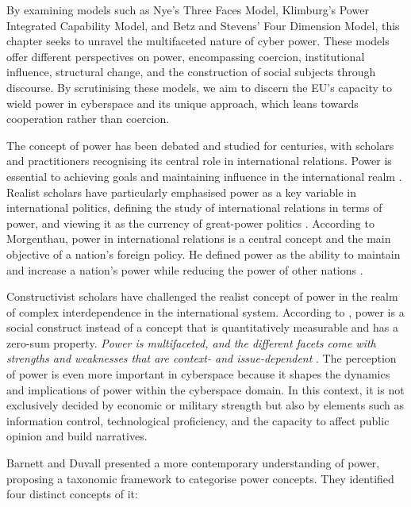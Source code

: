 By examining models such as Nye's Three Faces Model, Klimburg's Power Integrated Capability Model, and Betz and Stevens' Four Dimension Model, this chapter seeks to unravel the multifaceted nature of cyber power. These models offer different perspectives on power, encompassing coercion, institutional influence, structural change, and the construction of social subjects through discourse. By scrutinising these models, we aim to discern the EU's capacity to wield power in cyberspace and its unique approach, which leans towards cooperation rather than coercion.

The concept of power has been debated and studied for centuries, with scholars and practitioners recognising its central role in international relations. Power is essential to achieving goals and maintaining influence in the international realm \autocite{holsti_1964_the}. Realist scholars have particularly emphasised power as a key variable in international politics, defining the study of international relations in terms of power, and viewing it as the currency of great-power politics \autocite{fels_2016_power}. According to Morgenthau, power in international relations is a central concept and the main objective of a nation's foreign policy. He defined power as the ability to maintain and increase a nation's power while reducing the power of other nations \autocite{morgenthau_1948_politics}. 

Constructivist scholars have challenged the realist concept of power in the realm of complex interdependence in the international system. According to \textcite{pan_2014_rethinking}, power is a social construct instead of a concept that is quantitatively measurable and has a zero-sum property. \textit{Power is multifaceted, and the different facets come with strengths and weaknesses that are context- and issue-dependent} \autocite[14]{dunncavelty_2018_europes}. The perception of power is even more important in cyberspace because it shapes the dynamics and implications of power within the cyberspace domain. In this context, it is not exclusively decided by economic or military strength but also by elements such as information control, technological proficiency, and the capacity to affect public opinion and build narratives.

Barnett and Duvall \textcite{barnett_2005_power} presented a more contemporary understanding of power, proposing a taxonomic framework to categorise power concepts. They identified four distinct concepts of it:

